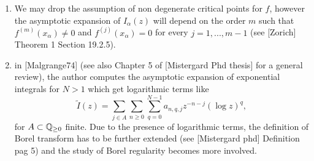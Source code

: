 \documentclass[11pt,a4paper,twoside,leqno,noamsfonts]{amsart}
\numberwithin{equation}{section}
\begin{document}
\begin{remark}
\begin{enumerate}
\item We may drop the assumption of non degenerate critical points for $f$, however the asymptotic expansion of $I_\alpha(z)$ will depend on the order $m$ such that $f^{(m)}(x_\alpha)\neq 0$ and $f^{(j)}(x_\alpha)=0$ for every $j=1,...,m-1$ (see [Zorich] Theorem 1 Section 19.2.5).  
\item in [Malgrange74] (see also Chapter 5 of [Mistergard Phd thesis] for a general review), the author computes the asymptotic expansion of exponential integrals for $N>1$ which get logarithmic terms like 
\[\tilde{I}(z)=\sum_{j\in A} \sum_{n\geq 0}\sum_{q=0}^{N-1}a_{n,q,j}z^{-n-j}(\log z)^q,\] for $A\subset\mathbb Q_{\geq 0}$ finite. Due to the presence of logarithmic terms, the definition of Borel transform has to be further extended  (see [Mistergard phd] Definition pag 5) and the study of Borel regularity becomes more involved.   
\end{enumerate}
\end{remark}
\end{document}
